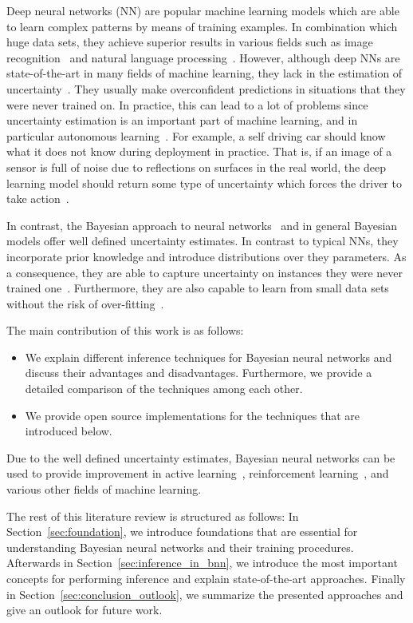 \documentclass[runningheads]{llncs}
\begin{document}
Deep neural networks (NN) are popular machine learning models which are able to learn complex patterns by means of training examples.
In combination which huge data sets, they achieve superior results in various fields such as image recognition~\cite{efficient_net,krizhevsky2012imagenet} and natural language processing~\cite{nlp1,nlp2}.
However, although deep NNs are state-of-the-art in many fields of machine learning, they lack in the estimation of uncertainty~\cite{Gal2015Bayesian,Kendall2017Uncertainy}.
They usually make overconfident predictions in situations that they were never trained on.
In practice, this can lead to a lot of problems since uncertainty estimation is an important part of machine learning, and in particular autonomous learning~\cite{gal2017deep}.
For example, a self driving car should know what it does not know during deployment in practice.
That is, if an image of a sensor is full of noise due to reflections on surfaces in the real world, the deep learning model should return some type of uncertainty which forces the driver to take action~\cite{car_accident}.

In contrast, the Bayesian approach to neural networks~\cite{mackay1992practical,Neal:1995:BLN:922680} and in general Bayesian models offer well defined uncertainty estimates.
In contrast to typical NNs, they incorporate prior knowledge and introduce distributions over they parameters.
As a consequence, they are able to capture uncertainty on instances they were never trained one~\cite{Kendall2017Uncertainy}.
Furthermore, they are also capable to learn from small data sets without the risk of over-fitting~\cite{Gal2015Bayesian}.

The main contribution of this work is as follows:
\begin{itemize}
\item We explain different inference techniques for Bayesian neural networks and discuss their advantages and disadvantages. 
Furthermore, we provide a detailed comparison of the techniques among each other.
\item We provide open source implementations for the techniques that are introduced below.
\end{itemize}
Due to the well defined uncertainty estimates, Bayesian neural networks can be used to provide improvement in active learning~\cite{gal2017deep,hernandez2015probabilistic}, reinforcement learning~\cite{BlundellBBB,Gal2016Dropout}, and various other fields of machine learning.

The rest of this literature review is structured as follows: 
In Section~\ref{sec:foundation}, we introduce foundations that are essential for understanding Bayesian neural networks and their training procedures.
Afterwards in Section~\ref{sec:inference_in_bnn}, we introduce the most important concepts for performing inference and explain state-of-the-art approaches.
Finally in Section~\ref{sec:conclusion_outlook}, we summarize the presented approaches and give an outlook for future work.
\end{document}
